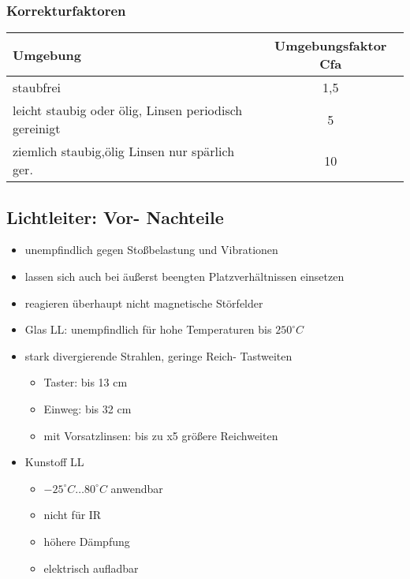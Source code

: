 \documentclass[a4paper]{scrartcl}
\begin{document}
\subsubsection{Korrekturfaktoren}
\begin{tabular}{l|c}
Umgebung & Umgebungsfaktor Cfa\\ \hline 
staubfrei & 1,5\\
leicht staubig oder ölig, Linsen periodisch gereinigt & 5\\
ziemlich staubig,ölig Linsen nur spärlich ger. & 10\\
\end{tabular}

\subsection{Lichtleiter: Vor- Nachteile}
\begin{itemize}
\item unempfindlich gegen Stoßbelastung und Vibrationen
\item lassen sich auch bei äußerst beengten Platzverhältnissen einsetzen
\item reagieren überhaupt nicht magnetische Störfelder
\item Glas LL: unempfindlich für hohe Temperaturen bis $250^\circ C$
\item stark divergierende Strahlen, geringe Reich- Tastweiten
    \begin{itemize}
    \item Taster: bis 13 cm
    \item Einweg: bis 32 cm
    \item mit Vorsatzlinsen: bis zu x5 größere Reichweiten
    \end{itemize}
\item Kunstoff LL
    \begin{itemize}
    \item $-25^\circ C \dots 80^\circ C$ anwendbar
    \item nicht für IR
    \item höhere Dämpfung
    \item elektrisch aufladbar
    \end{itemize}
\end{itemize}
\end{document}
